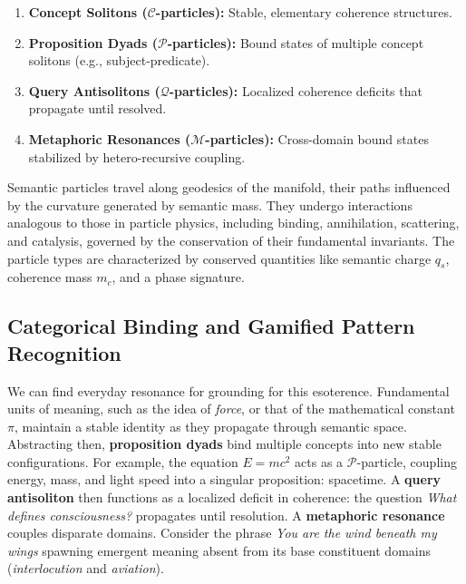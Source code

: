 \begin{enumerate}

    \item \textbf{Concept Solitons (\(\mathcal{C}\)-particles):} Stable, elementary coherence structures.

    \item \textbf{Proposition Dyads (\(\mathcal{P}\)-particles):} Bound states of multiple concept solitons (e.g., subject-predicate).

    \item \textbf{Query Antisolitons (\(\mathcal{Q}\)-particles):} Localized coherence deficits that propagate until resolved.

    \item \textbf{Metaphoric Resonances (\(\mathcal{M}\)-particles):} Cross-domain bound states stabilized by hetero-recursive coupling.

\end{enumerate}

Semantic particles travel along geodesics of the manifold, their paths influenced by the curvature generated by semantic mass. They undergo interactions analogous to those in particle physics, including binding, annihilation, scattering, and catalysis, governed by the conservation of their fundamental invariants. The particle types are characterized by conserved quantities like semantic charge \(q_s\), coherence mass \(m_c\), and a phase signature.


\subsection{Categorical Binding and Gamified Pattern Recognition}
\label{13.6.2:categorical_binding_and_gamified_pattern_recognition}

We can find everyday resonance for grounding for this esoterence. Fundamental units of meaning, such as the idea of \textit{force}, or that of the mathematical constant \(\pi\), maintain a stable identity as they propagate through semantic space. Abstracting then, \textbf{proposition dyads} bind multiple concepts into new stable configurations. For example, the equation \(E = mc^2\) acts as a \(\mathcal{P}\)-particle, coupling energy, mass, and light speed into a singular proposition: spacetime. A \textbf{query antisoliton} then functions as a localized deficit in coherence: the question \textit{What defines consciousness?} propagates until resolution. A \textbf{metaphoric resonance} couples disparate domains. Consider the phrase \textit{You are the wind beneath my wings} spawning emergent meaning absent from its base constituent domains (\textit{interlocution} and \textit{aviation}).

